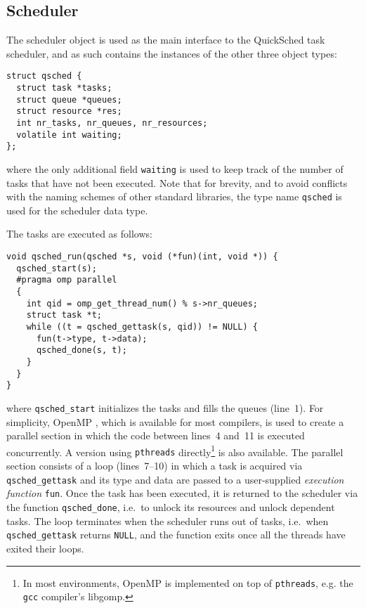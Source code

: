 \documentclass[fleqn,10pt]{wlpeerj}
\begin{document}
\subsection{Scheduler}

The scheduler object is used as the main interface to the
QuickSched task scheduler, and as such contains the instances
of the other three object types:
\begin{center}\begin{minipage}{0.9\textwidth}
    \begin{lstlisting}
struct qsched {
  struct task *tasks;
  struct queue *queues;
  struct resource *res;
  int nr_tasks, nr_queues, nr_resources;
  volatile int waiting;
};
    \end{lstlisting}
\end{minipage}\end{center}
\noindent where the only additional field {\tt waiting} is
used to keep track of the number of tasks that have not been
executed.
Note that for brevity, and to avoid conflicts with the naming
schemes of other standard libraries, the type name {\tt qsched}
is used for the scheduler data type.

The tasks are executed as follows:
\begin{center}\begin{minipage}{0.9\textwidth}
    \begin{lstlisting}
void qsched_run(qsched *s, void (*fun)(int, void *)) {
  qsched_start(s);
  #pragma omp parallel
  {
    int qid = omp_get_thread_num() % s->nr_queues;
    struct task *t;
    while ((t = qsched_gettask(s, qid)) != NULL) {
      fun(t->type, t->data);
      qsched_done(s, t);
    }
  }
}
    \end{lstlisting}
\end{minipage}\end{center}
\noindent where {\tt qsched\_start} initializes the tasks and
fills the queues (line~1).
For simplicity, OpenMP \citep{ref:Dagum1998}, which is available
for most compilers, is used to create a parallel section
in which the code between lines~4 and~11 is executed
concurrently.
A version using {\tt pthreads} \citep{ref:Pthreads1995}
directly\footnote{In most environments, OpenMP is implemented
on top of {\tt pthreads}, e.g. the {\tt gcc} compiler's libgomp.}
is also available.
The parallel section consists of a loop (lines~7--10) in
which a task is acquired via {\tt qsched\_gettask}
and its type and data are passed to a user-supplied
{\em execution function} {\tt fun}.
Once the task has been executed, it is returned to the
scheduler via the function {\tt qsched\_done}, i.e.~to
unlock its resources and unlock dependent tasks.
The loop terminates when the scheduler runs out of tasks,
i.e.~when {\tt qsched\_gettask} returns {\tt NULL}, and
the function exits once all the threads have exited their
loops.
\end{document}
